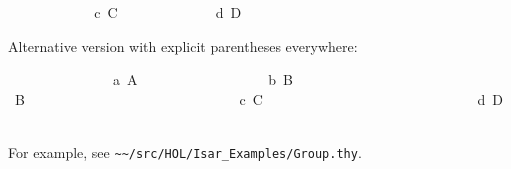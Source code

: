 \begin{isabellebody}
\isanewline
\ \ \ \ \isamarkupfalse%
\isanewline
\ \ \ \ \ \ \isamarkupfalse%
\ c{}\ C\ \isamarkupfalse%
\isanewline
\ \ \ \ \isamarkupfalse%
\isanewline
\ \ \ \ \ \ \isamarkupfalse%
\ d{}\ D\ \isamarkupfalse%
\isanewline
\ \ \ \ \isamarkupfalse%
\isanewline
\ \ \isamarkupfalse%
%
\begin{isamarkuptxt}%
Alternative version with explicit parentheses everywhere:%
\end{isamarkuptxt}%
\isamarkuptrue%
\ \ \isamarkupfalse%
\isanewline
\ \ \ \ \isamarkupfalse%
\isanewline
\ \ \ \ \ \ \isamarkupfalse%
\ a{}\ A\ \isamarkupfalse%
\isanewline
\ \ \ \ \isamarkupfalse%
\isanewline
\ \ \ \ \isamarkupfalse%
\isanewline
\ \ \ \ \ \ \isamarkupfalse%
\ b{}\ B\isanewline
\ \ \ \ \ \ \isamarkupfalse%
\ {}\isanewline
\ \ \ \ \ \ \ \ \isamarkupfalse%
\isanewline
\ \ \ \ \ \ \ \ \ \ \isamarkupfalse%
\ B\ \isamarkupfalse%
\isanewline
\ \ \ \ \ \ \ \ \isamarkupfalse%
\isanewline
\ \ \ \ \ \ \ \ \isamarkupfalse%
\isanewline
\ \ \ \ \ \ \ \ \ \ \isamarkupfalse%
\ c{}\ C\ \isamarkupfalse%
\isanewline
\ \ \ \ \ \ \ \ \isamarkupfalse%
\isanewline
\ \ \ \ \ \ \ \ \isamarkupfalse%
\isanewline
\ \ \ \ \ \ \ \ \ \ \isamarkupfalse%
\ d{}\ D\ \isamarkupfalse%
\isanewline
\ \ \ \ \ \ \ \ \isamarkupfalse%
\isanewline
\ \ \ \ \ \ \isamarkupfalse%
\isanewline
\ \ \ \ \isamarkupfalse%
\isanewline
\ \ \isamarkupfalse%
%
\endisatagproof
{\isafoldproof}%
%
\isadelimproof
\isanewline
%
\endisadelimproof
\isanewline
{}\isamarkupfalse%
%
\isamarkuptrue%
%
\begin{isamarkuptext}%
For example, see \verb|~~/src/HOL/Isar_Examples/Group.thy|.%
\end{isamarkuptext}%
\isamarkuptrue%
%
\isamarkuptrue%
%
\begin{isamarkuptext}%
\begin{itemize}


\end{itemize}
\end{isamarkuptext}
\end{isabellebody}
